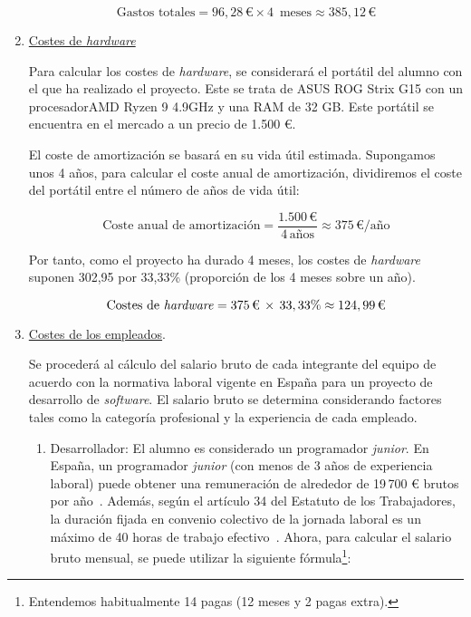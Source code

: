 \begin{enumerate}
		\[
			\text{{Gastos totales}}= 96,28 \, \text{{€}}\times 4 \,\text{{ meses}}\approx
			385,12 \, \text{{€}}
		\]
	\item \underline{Costes de \textit{hardware}}

		Para calcular los costes de \textit{hardware}, se considerará el portátil del
		alumno con el que ha realizado el proyecto. Este se trata de ASUS ROG Strix
		G15 con un procesadorAMD Ryzen 9 4.9GHz y una RAM de 32 GB. Este portátil se
		encuentra en el mercado a un precio de 1.500 €.

		El coste de amortización se basará en su vida útil estimada. Supongamos unos
		4 años, para calcular el coste anual de amortización, dividiremos el coste del
		portátil entre el número de años de vida útil:

		\[
			\text{{Coste anual de amortización}}= \frac{{1.500 \, \text{{€}}}}{{4 \, \text{{años}}}}
			\approx 375\, \text{{€/año}}
		\]

		Por tanto, como el proyecto ha durado 4 meses, los costes de \textit{hardware}
		suponen 302,95 por 33,33\% (proporción de los 4 meses sobre un año).

		\[
			\text{{Costes de \textit{hardware}}}= 375 \,\text{{€}}\, \times \, 33,33\%
			\approx 124,99 \, \text{{€}}
		\]
		\newline

	\item \underline{Costes de los empleados}.

		Se procederá al cálculo del salario bruto de cada integrante del equipo de
		acuerdo con la normativa laboral vigente en España para un proyecto de
		desarrollo de \textit{software}. El salario bruto se determina considerando
		factores tales como la categoría profesional y la experiencia de cada
		empleado.

		\begin{enumerate}
			\item Desarrollador: El alumno es considerado un programador \textit{junior}.
				En España, un programador \textit{junior} (con menos de 3 años de experiencia
				laboral) puede obtener una remuneración de alrededor de 19\,700 € brutos
				por año~\cite{Jobted}. Además, según el artículo 34 del Estatuto de los
				Trabajadores, la duración fijada en convenio colectivo de la jornada laboral
				es un máximo de 40 horas de trabajo efectivo~\cite{jornadalaboral}.
				Ahora, para calcular el salario bruto mensual, se puede utilizar la
				siguiente fórmula\footnote{Entendemos habitualmente 14 pagas (12 meses y
				2 pagas extra).}:


\end{enumerate}
\end{enumerate}
